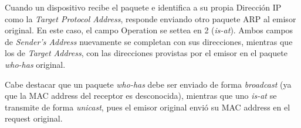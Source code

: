 \par Cuando un dispositivo recibe el paquete e identifica a su propia Dirección IP como la \textit{Target Protocol Address}, responde enviando otro paquete ARP al emisor original.
En este caso, el campo Operation se settea en 2 (\textit{is-at}).
Ambos campos de \textit{Sender's Address} nuevamente se completan con sus direcciones, mientras que los de \textit{Target Address}, con las direcciones provistas por el emisor en el paquete \textit{who-has} original.

\par Cabe destacar que un paquete \textit{who-has} debe ser enviado de forma \textit{broadcast} (ya que la MAC address del receptor es desconocida), mientras que uno \textit{is-at} se transmite de forma \textit{unicast}, pues el emisor original envió su MAC address en el request original.
